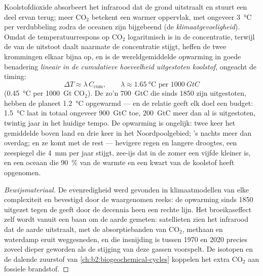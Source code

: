 \begin{proposition}\label{prop:b2:global-change:tcre}
Koolstofdioxide absorbeert het infrarood dat de grond uitstraalt en stuurt een
deel ervan terug; meer \ensuremath{\mathrm{CO_2}} betekent een warmer oppervlak, met
ongeveer \qty{3}{\celsius} per verdubbeling zodra de oceanen zijn bijgebeend
(de \emph{klimaatgevoeligheid}). Omdat de temperatuurrespons op
\ensuremath{\mathrm{CO_2}} logaritmisch is in de concentratie, terwijl de  van de uitstoot daalt naarmate de concentratie stijgt, heffen de twee
krommingen elkaar bijna op, en is de wereldgemiddelde opwarming in goede
benadering \emph{lineair in de cumulatieve hoeveelheid uitgestoten
koolstof}, ongeacht de timing:
\[
\Delta T \approx \lambda\,C_{\text{cum}}, \qquad \lambda \approx
\qty{1.65}{\celsius} \text{ per } \qty{1000}{GtC}
\]
(\qty{0.45}{\celsius} per \qty{1000}{Gt} \ensuremath{\mathrm{CO_2}}). De zo'n
\qty{700}{GtC} die sinds 1850 zijn uitgestoten, hebben de planeet
\qty{1.2}{\celsius} opgewarmd --- en de relatie geeft elk doel een
budget: \qty{1.5}{\celsius} laat in totaal ongeveer \qty{900}{GtC} toe,
\qty{200}{GtC} meer dan al is uitgestoten, twintig jaar in het
huidige tempo. De opwarming is ongelijk: twee keer het gemiddelde boven land
en drie keer in het Noordpoolgebied; 's nachts meer dan overdag; en ze komt
met de rest --- hevigere regen en langere droogtes, een zeespiegel
die \qty{4}{mm} per jaar stijgt, zee-ijs dat in de zomer een vijfde kleiner is,
en een oceaan die \qty{90}{\%} van de warmte en een kwart van de koolstof heeft
opgenomen.
\end{proposition}
\begin{proof}[Bewijsmateriaal]
De evenredigheid werd gevonden in klimaatmodellen van elke complexiteit en
bevestigd door de waargenomen reeks: de opwarming sinds 1850 uitgezet tegen
de  geeft door de decennia heen een rechte lijn. Het
broeikaseffect zelf wordt vanuit een baan om de aarde gemeten: satellieten zien
het infrarood dat de aarde uitstraalt, met de absorptiebanden van
\ensuremath{\mathrm{CO_2}}, methaan en waterdamp eruit weggesneden, en die insnijding is
tussen 1970 en 2020 precies zoveel dieper geworden als de stijging van deze
gassen voorspelt. De isotopen en de dalende zuurstof van
\cref{ch:b2:biogeochemical-cycles} koppelen het extra
\ensuremath{\mathrm{CO_2}} aan fossiele brandstof.
\end{proof}

